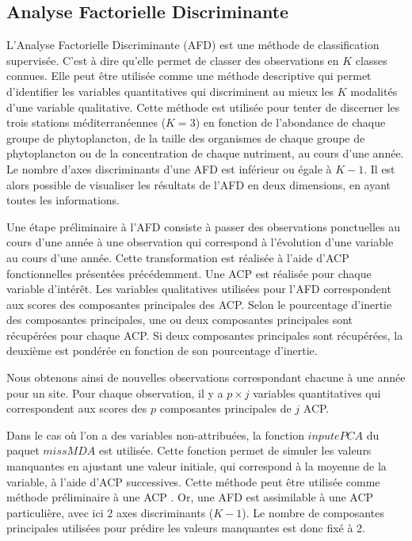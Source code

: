 \documentclass[12pt]{article}
\begin{document}
\subsection{Analyse Factorielle Discriminante}

L’Analyse Factorielle Discriminante (AFD) est une méthode de classification supervisée. C’est à dire qu’elle permet de classer des observations en $K$ classes connues. Elle peut être utilisée comme une méthode descriptive qui permet d’identifier les variables quantitatives qui discriminent au mieux les $K$ modalités d’une variable qualitative. Cette méthode est utilisée pour tenter de discerner les trois stations méditerranéennes ($K=3$) en fonction de l’abondance de chaque groupe de phytoplancton, de la taille des organismes de chaque groupe de phytoplancton ou de la concentration de chaque nutriment, au cours d’une année. Le nombre d’axes discriminants d’une AFD est inférieur ou égale à $K-1$. Il est alors possible de visualiser les résultats de l’AFD en deux dimensions, en ayant toutes les informations.  

Une étape préliminaire à l’AFD consiste à passer des observations ponctuelles au cours d’une année à une observation qui correspond à l’évolution d’une variable au cours d’une année. Cette transformation est réalisée à l’aide d’ACP fonctionnelles présentées précédemment. Une ACP est réalisée pour chaque variable d’intérêt. Les variables qualitatives utilisées pour l’AFD correspondent aux scores des composantes principales des ACP. Selon le pourcentage d’inertie des composantes principales, une ou deux composantes principales sont récupérées pour chaque ACP. Si deux composantes principales sont récupérées, la deuxième est pondérée en fonction de son pourcentage d’inertie. 

Nous obtenons ainsi de nouvelles observations correspondant chacune à une année pour un site. Pour chaque observation, il y a $p \times j$ variables quantitatives qui correspondent aux scores des $p$ composantes principales de $j$ ACP. 

Dans le cas où l’on a des variables non-attribuées, la fonction $inputePCA$ du paquet $missMDA$ est utilisée. Cette fonction permet de simuler les valeurs manquantes en ajustant une valeur initiale, qui correspond à la moyenne de la variable, à l’aide d’ACP successives. Cette méthode peut être utilisée comme méthode préliminaire à une ACP \citep{Josse2012}. Or, une AFD est assimilable à une ACP particulière, avec ici 2 axes discriminants ($K-1$). Le nombre de composantes principales utilisées pour prédire les valeurs manquantes est donc fixé à 2. 
\end{document}
